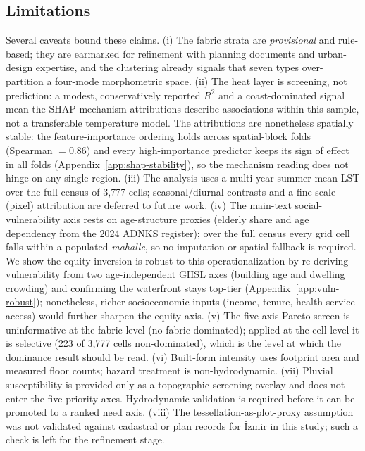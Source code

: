 \subsection{Limitations}
\label{sec:disc-limits}
Several caveats bound these claims. (i) The fabric strata are \emph{provisional} and
rule-based; they are earmarked for refinement with planning documents and
urban-design expertise, and the clustering already signals that seven types
over-partition a four-mode morphometric space. (ii) The heat layer is screening,
not prediction: a modest, conservatively reported $R^2$ and a coast-dominated signal mean
the SHAP mechanism attributions describe associations within this sample, not a
transferable temperature model. The attributions are nonetheless spatially stable: the
feature-importance ordering holds across spatial-block folds (Spearman $= 0.86$) and
every high-importance predictor keeps its sign of effect in all folds
(Appendix~\ref{app:shap-stability}), so the mechanism reading does not hinge on any
single region. (iii) The analysis uses a multi-year summer-mean
LST over the full census of 3{,}777 cells; seasonal/diurnal contrasts and a fine-scale
(pixel) attribution are deferred to future work. (iv) The main-text social-vulnerability axis rests on
age-structure proxies (elderly share and age dependency from the 2024 ADNKS register);
over the full census every grid cell falls within a populated \emph{mahalle}, so no
imputation or spatial fallback is required. We show the equity inversion is robust to
this operationalization by re-deriving vulnerability from two age-independent GHSL axes
(building age and dwelling crowding) and confirming the waterfront stays top-tier
(Appendix~\ref{app:vuln-robust}); nonetheless, richer socioeconomic inputs (income,
tenure, health-service access) would further sharpen the equity axis. (v) The five-axis Pareto
screen is uninformative at the fabric level (no fabric dominated); applied at the
cell level it is selective (223 of 3{,}777 cells non-dominated), which is the level at
which the dominance result should be read. (vi) Built-form intensity uses
footprint area and measured floor counts; hazard treatment is non-hydrodynamic.
(vii) Pluvial susceptibility is provided only as a topographic screening overlay
and does not enter the five priority axes. Hydrodynamic validation is required
before it can be promoted to a ranked need axis. (viii) The tessellation-as-plot-proxy assumption was not validated against cadastral
or plan records for \.{I}zmir in this study; such a check is left for the
refinement stage.

